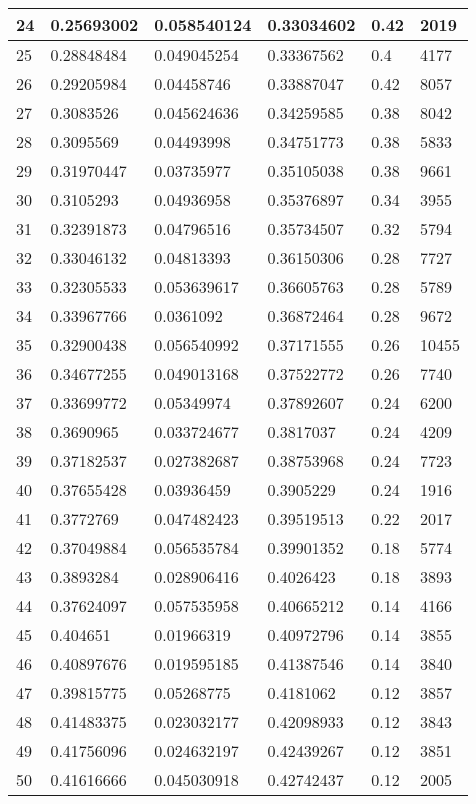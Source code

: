 \begin{longtable}{|l|l|l|l|l|l|}
24 & 0.25693002 & 0.058540124 & 0.33034602 & 0.42 & 2019 \\ \hline 
25 & 0.28848484 & 0.049045254 & 0.33367562 & 0.4 & 4177 \\ \hline 
26 & 0.29205984 & 0.04458746 & 0.33887047 & 0.42 & 8057 \\ \hline 
27 & 0.3083526 & 0.045624636 & 0.34259585 & 0.38 & 8042 \\ \hline 
28 & 0.3095569 & 0.04493998 & 0.34751773 & 0.38 & 5833 \\ \hline 
29 & 0.31970447 & 0.03735977 & 0.35105038 & 0.38 & 9661 \\ \hline 
30 & 0.3105293 & 0.04936958 & 0.35376897 & 0.34 & 3955 \\ \hline 
31 & 0.32391873 & 0.04796516 & 0.35734507 & 0.32 & 5794 \\ \hline 
32 & 0.33046132 & 0.04813393 & 0.36150306 & 0.28 & 7727 \\ \hline 
33 & 0.32305533 & 0.053639617 & 0.36605763 & 0.28 & 5789 \\ \hline 
34 & 0.33967766 & 0.0361092 & 0.36872464 & 0.28 & 9672 \\ \hline 
35 & 0.32900438 & 0.056540992 & 0.37171555 & 0.26 & 10455 \\ \hline 
36 & 0.34677255 & 0.049013168 & 0.37522772 & 0.26 & 7740 \\ \hline 
37 & 0.33699772 & 0.05349974 & 0.37892607 & 0.24 & 6200 \\ \hline 
38 & 0.3690965 & 0.033724677 & 0.3817037 & 0.24 & 4209 \\ \hline 
39 & 0.37182537 & 0.027382687 & 0.38753968 & 0.24 & 7723 \\ \hline 
40 & 0.37655428 & 0.03936459 & 0.3905229 & 0.24 & 1916 \\ \hline 
41 & 0.3772769 & 0.047482423 & 0.39519513 & 0.22 & 2017 \\ \hline 
42 & 0.37049884 & 0.056535784 & 0.39901352 & 0.18 & 5774 \\ \hline 
43 & 0.3893284 & 0.028906416 & 0.4026423 & 0.18 & 3893 \\ \hline 
44 & 0.37624097 & 0.057535958 & 0.40665212 & 0.14 & 4166 \\ \hline 
45 & 0.404651 & 0.01966319 & 0.40972796 & 0.14 & 3855 \\ \hline 
46 & 0.40897676 & 0.019595185 & 0.41387546 & 0.14 & 3840 \\ \hline 
47 & 0.39815775 & 0.05268775 & 0.4181062 & 0.12 & 3857 \\ \hline 
48 & 0.41483375 & 0.023032177 & 0.42098933 & 0.12 & 3843 \\ \hline 
49 & 0.41756096 & 0.024632197 & 0.42439267 & 0.12 & 3851 \\ \hline 
50 & 0.41616666 & 0.045030918 & 0.42742437 & 0.12 & 2005 \\ \hline 
\end{longtable}